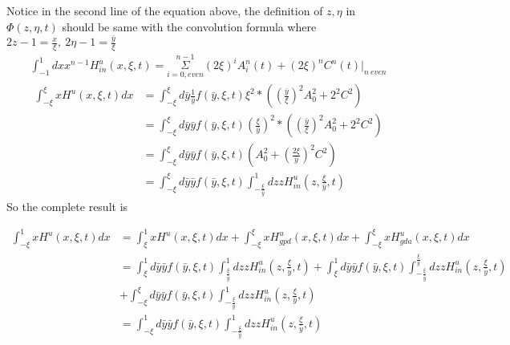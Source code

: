 \documentclass[preprintnumbers,prd,superscriptaddress,preprint]{revtex4-1}
\begin{document}
	Notice in the second line of the equation above, the definition of $z,\eta$ in $\Phi(z,\eta,t)$ should be same with the convolution formula where $2z-1=\frac{x}{\xi},\ 2\eta-1=\frac{\bar{y}}{\xi}$ 
	\begin{align*}
		\int_{-1}^{1}dxx^{n-1}H^{u}_{in}(x,\xi,t)=\underset{i=0,even}{\overset{n-1}{\Sigma}}(2\xi)^{i}A^{n}_{i}(t)+(2\xi)^{n}C^{n}(t)|_{n\ even}
	\end{align*}
	\begin{align*}
		\int_{-\xi}^{\xi}xH^{u}(x,\xi,t)dx & =\int_{-\xi}^{\xi}d\bar{y}\frac{1}{\bar{y}}f(\bar{y},\xi,t)\xi^{2}*((\frac{\bar{y}}{\xi})^{2}A_{0}^{2}+2^{2}C^{2})\\
		& =\int_{-\xi}^{\xi}d\bar{y}\bar{y}f(\bar{y},\xi,t)(\frac{\xi}{\bar{y}})^{2}*((\frac{\bar{y}}{\xi})^{2}A_{0}^{2}+2^{2}C^{2})\\
		& =\int_{-\xi}^{\xi}d\bar{y}\bar{y}f(\bar{y},\xi,t)(A_{0}^{2}+(\frac{2\xi}{\bar{y}})^{2}C^{2})\\
		& =\int_{-\xi}^{\xi}d\bar{y}\bar{y}f(\bar{y},\xi,t)\int_{-\frac{\xi}{\bar{y}}}^{1}dzzH_{in}^{u}(z,\frac{\xi}{\bar{y}},t)
	\end{align*}
	So the complete result is 
	
	\begin{align*}
		\int_{-\xi}^{1}xH^{u}(x,\xi,t)dx & =\int_{\xi}^{1}xH^{u}(x,\xi,t)dx+\int_{-\xi}^{\xi}xH_{gpd}^{u}(x,\xi,t)dx+\int_{-\xi}^{\xi}xH_{gda}^{u}(x,\xi,t)dx\\
		& =\int_{\xi}^{1}d\bar{y}\bar{y}f(\bar{y},\xi,t)\int_{\frac{\xi}{\bar{y}}}^{1}dzzH_{in}^{u}(z,\frac{\xi}{\bar{y}},t)+\int_{\xi}^{1}d\bar{y}\bar{y}f(\bar{y},\xi,t)\int_{-\frac{\xi}{\bar{y}}}^{\frac{\xi}{\bar{y}}}dzzH_{in}^{u}(z,\frac{\xi}{\bar{y}},t)\\
		& +\int_{-\xi}^{\xi}d\bar{y}\bar{y}f(\bar{y},\xi,t)\int_{-\frac{\xi}{\bar{y}}}^{1}dzzH_{in}^{u}(z,\frac{\xi}{\bar{y}},t)\\
		& =\int_{-\xi}^{1}d\bar{y}\bar{y}f(\bar{y},\xi,t)\int_{-\frac{\xi}{\bar{y}}}^{1}dzzH_{in}^{u}(z,\frac{\xi}{\bar{y}},t)
	\end{align*}
	
\end{document}
